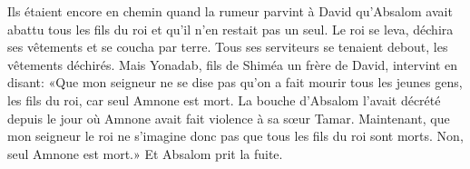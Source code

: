 Ils étaient encore en chemin
	quand la rumeur parvint à David qu’Absalom avait abattu tous les fils du roi
	et qu’il n’en restait pas un seul.
Le roi se leva, déchira ses vêtements et se coucha par terre.
	Tous ses serviteurs se tenaient debout, les vêtements déchirés.
Mais Yonadab, fils de Shiméa un frère de David, intervint en disant:
	«Que mon seigneur ne se dise pas qu’on a fait mourir tous les jeunes gens,
		les fils du roi,
	car seul Amnone est mort.
La bouche d’Absalom l’avait décrété
		depuis le jour où Amnone avait fait violence à sa sœur Tamar.
Maintenant, que mon seigneur le roi ne s’imagine donc pas
		que tous les fils du roi sont morts.
	Non, seul Amnone est mort.»
Et Absalom prit la fuite.
